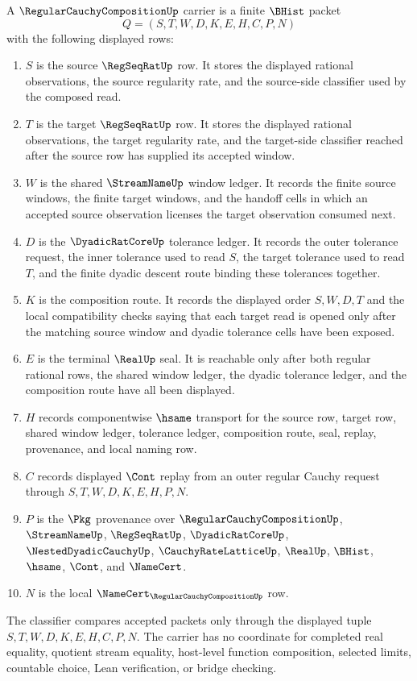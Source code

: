 \begin{definition}\label{def:regular-cauchy-composition-carrier}
A $\RegularCauchyCompositionUp$ carrier is a finite $\BHist$ packet
$$
Q=(S,T,W,D,K,E,H,C,P,N)
$$
with the following displayed rows:
\begin{enumerate}
\item $S$ is the source $\RegSeqRatUp$ row. It stores the displayed rational observations, the source regularity rate, and the source-side classifier used by the composed read.
\item $T$ is the target $\RegSeqRatUp$ row. It stores the displayed rational observations, the target regularity rate, and the target-side classifier reached after the source row has supplied its accepted window.
\item $W$ is the shared $\StreamNameUp$ window ledger. It records the finite source windows, the finite target windows, and the handoff cells in which an accepted source observation licenses the target observation consumed next.
\item $D$ is the $\DyadicRatCoreUp$ tolerance ledger. It records the outer tolerance request, the inner tolerance used to read $S$, the target tolerance used to read $T$, and the finite dyadic descent route binding these tolerances together.
\item $K$ is the composition route. It records the displayed order $S,W,D,T$ and the local compatibility checks saying that each target read is opened only after the matching source window and dyadic tolerance cells have been exposed.
\item $E$ is the terminal $\RealUp$ seal. It is reachable only after both regular rational rows, the shared window ledger, the dyadic tolerance ledger, and the composition route have all been displayed.
\item $H$ records componentwise $\hsame$ transport for the source row, target row, shared window ledger, tolerance ledger, composition route, seal, replay, provenance, and local naming row.
\item $C$ records displayed $\Cont$ replay from an outer regular Cauchy request through $S,T,W,D,K,E,H,P,N$.
\item $P$ is the $\Pkg$ provenance over $\RegularCauchyCompositionUp$, $\StreamNameUp$, $\RegSeqRatUp$, $\DyadicRatCoreUp$, $\NestedDyadicCauchyUp$, $\CauchyRateLatticeUp$, $\RealUp$, $\BHist$, $\hsame$, $\Cont$, and $\NameCert$.
\item $N$ is the local $\NameCert_{\RegularCauchyCompositionUp}$ row.
\end{enumerate}
The classifier compares accepted packets only through the displayed tuple $S,T,W,D,K,E,H,C,P,N$. The carrier has no coordinate for completed real equality, quotient stream equality, host-level function composition, selected limits, countable choice, Lean verification, or bridge checking.
\end{definition}

